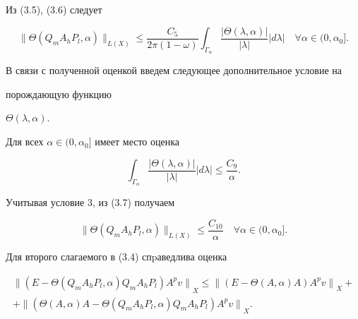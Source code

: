 Из (3.5), (3.6) следует


\begin{equation}


\| \Theta(Q_m A_h P_l,\alpha) \|_{L(X)} \leq \frac{C_5}


{2 \pi (1- \omega)}


\int_{\Gamma_{\alpha}}


\frac{| \Theta( \lambda, \alpha) |}{ | \lambda |}


| d \lambda |\quad \forall \alpha \in (0, \alpha_0].


\tag{3.7}


\end{equation}





В связи с полученной оценкой введем следующее дополнительное условие на


порождающую функцию


$\Theta(\lambda,\alpha)$.





\begin{cond}


Для всех $\alpha \in (0, \alpha_0]$ имеет место оценка


$$


\int_{\Gamma_{\alpha}}


\frac{| \Theta( \lambda, \alpha) |}{ | \lambda |}


| d \lambda | \leq \frac{C_9}{\alpha}.


$$


\end{cond}





Учитывая условие 3, из (3.7) получаем


\begin{equation}


\| \Theta(Q_m A_h P_l,\alpha) \|_{L(X)} \leq \frac{C_{10}}


{\alpha} \quad \forall \alpha \in (0, \alpha_0].


\tag{3.8}


\end{equation}





Для второго слагаемого в (3.4) спpаведлива оценка


\begin{multline}


{\| (E-\Theta(Q_m A_h P_l,\alpha) Q_m A_h P_l) A^p v \|}_X \leq


{\| (E-\Theta( A,\alpha) A) A^p v \|}_X+ \\


+ {\| (\Theta( A,\alpha) A-\Theta(Q_m A_h P_l,\alpha) Q_m A_h P_l)


A^p v \|}_X.


\tag{3.9}


\end{multline}





